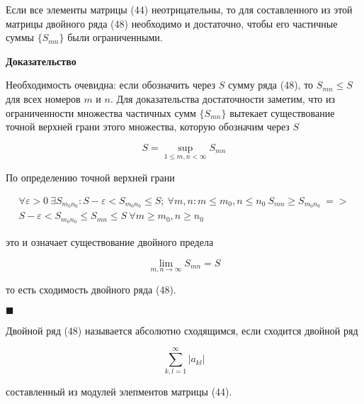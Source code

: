  \begin{theorem}
 	Если все элементы матрицы (44) неотрицательны, то для составленного из этой матрицы двойного ряда (48) необходимо и достаточно, чтобы его частичные суммы $\{S_{mn}\}$ были ограниченными.
 \end{theorem}
 \textbf{Доказательство}
 
 Необходимость очевидна: если обозначить через $S$ сумму ряда (48), то $S_{mn} \leqslant S$ для всех номеров $m$ и $n$. Для доказательства достаточности заметим, что из ограниченности множества частичных сумм $\{S_{mn}\}$ вытекает существование точной верхней грани этого множества, которую обозначим через $S$
 
 \begin{equation*}
 	S = \displaystyle\sup_{1 \leqslant m, n < \infty} S_{mn}
 \end{equation*}
 
 По определению точной верхней грани
 
 \begin{equation*}
 	\begin{gathered}
 		\forall \varepsilon > 0 \ \exists S_{m_0n_0} \colon S - \varepsilon < S_{m_0n_0} \leqslant S;\ \forall m, n \colon m \leqslant m_0, n \leqslant n_0 \ S_{mn} \geqslant S_{m_0n_0}\ => \\
 		S - \varepsilon < S_{m_0n_0} \leqslant S_{mn} \leqslant S\ \forall m \geqslant m_0, n \geqslant n_0
 	\end{gathered}
 \end{equation*}
 
 это и означает существование двойного предела
 
 \begin{equation*}
 	\displaystyle\lim_{m,n \rightarrow \infty} S_{mn} = S
 \end{equation*}
 
 то есть сходимость двойного ряда (48).
 
 \begin{flushright}
 	$\blacksquare$
 \end{flushright}
 
 \begin{definition}
 	Двойной ряд (48) называется абсолютно сходящимся, если сходится двойной ряд
 	
 	\begin{equation}
 		\displaystyle\sum_{k,l = 1}^\infty |a_{kl}|
 	\end{equation}
 	
 	составленный из модулей элепментов матрицы (44).
 \end{definition}
 
